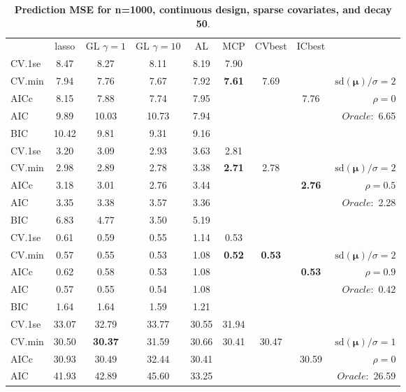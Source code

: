 \clearpage
\begin{table}\vspace{-.5cm}
\caption[l]{ { \bf Prediction MSE for n=1000, continuous design, 
sparse covariates, and  decay  50}.}
\vspace{-.5cm}
\footnotesize{}
\begin{center}
\begin{tabular}{l*{7}{c}|r}
 & lasso & GL $\gamma=1$ & GL $\gamma=10$ & AL & MCP  & CVbest & ICbest  \\
\cline{1-9}
CV.1se & 8.47 & 8.27 & 8.11 & 8.19 & 7.90 & & & \\
CV.min & 7.94 & 7.76 & 7.67 & 7.92 & {\bf 7.61} & 7.69 & & $\mathrm{sd}(\mathbf{\mu})/\sigma=2$ \\
AICc & 8.15 & 7.88 & 7.74 & 7.95 & & & 7.76 &  $\rho=0$ \\
AIC & 9.89 & 10.03 & 10.73 & 7.94 & & & &  \multirow{2}{*}{$Oracle: $ 6.65} \\
BIC & 10.42 & 9.81 & 9.31 & 9.16 & & & &  \\
 \hline 
CV.1se & 3.20 & 3.09 & 2.93 & 3.63 & 2.81 & & & \\
CV.min & 2.98 & 2.89 & 2.78 & 3.38 & {\bf 2.71} & 2.78 & & $\mathrm{sd}(\mathbf{\mu})/\sigma=2$ \\
AICc & 3.18 & 3.01 & 2.76 & 3.44 & & & {\bf 2.76} &  $\rho=0.5$ \\
AIC & 3.35 & 3.38 & 3.57 & 3.36 & & & &  \multirow{2}{*}{$Oracle: $ 2.28} \\
BIC & 6.83 & 4.77 & 3.50 & 5.19 & & & &  \\
 \hline 
CV.1se & 0.61 & 0.59 & 0.55 & 1.14 & 0.53 & & & \\
CV.min & 0.57 & 0.55 & 0.53 & 1.08 & {\bf 0.52} & {\bf 0.53} & & $\mathrm{sd}(\mathbf{\mu})/\sigma=2$ \\
AICc & 0.62 & 0.58 & 0.53 & 1.08 & & & {\bf 0.53} &  $\rho=0.9$ \\
AIC & 0.57 & 0.55 & 0.54 & 1.08 & & & &  \multirow{2}{*}{$Oracle: $ 0.42} \\
BIC & 1.64 & 1.64 & 1.59 & 1.21 & & & &  \\
 \hline 
CV.1se & 33.07 & 32.79 & 33.77 & 30.55 & 31.94 & & & \\
CV.min & 30.50 & {\bf 30.37} & 31.59 & 30.66 & 30.41 & 30.47 & & $\mathrm{sd}(\mathbf{\mu})/\sigma=1$ \\
AICc & 30.93 & 30.49 & 32.44 & 30.41 & & & 30.59 &  $\rho=0$ \\
AIC & 41.93 & 42.89 & 45.60 & 33.25 & & & &  \multirow{2}{*}{$Oracle: $ 26.59} \\

\end{tabular}
\end{center}
\end{table}
